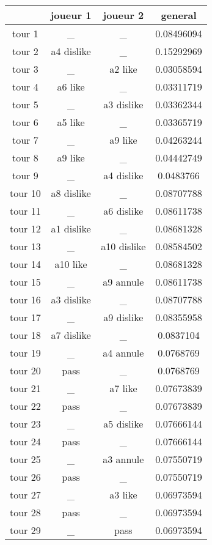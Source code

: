 \documentclass{article}
\begin{document}
\begin{tabular}{|c|c|c|c|}
\hline
& joueur 1 & joueur 2 & general \\
\hline
tour 1 & \_ & \_ & 0.08496094 \\
\hline
tour 2 & a4 dislike & \_ & 0.15292969 \\
\hline
tour 3 & \_ & a2 like & 0.03058594 \\
\hline
tour 4 & a6 like & \_ & 0.03311719 \\
\hline
tour 5 & \_ & a3 dislike & 0.03362344 \\
\hline
tour 6 & a5 like & \_ & 0.03365719 \\
\hline
tour 7 & \_ & a9 like & 0.04263244 \\
\hline
tour 8 & a9 like & \_ & 0.04442749 \\
\hline
tour 9 & \_ & a4 dislike & 0.0483766 \\
\hline
tour 10 & a8 dislike & \_ & 0.08707788 \\
\hline
tour 11 & \_ & a6 dislike & 0.08611738 \\
\hline
tour 12 & a1 dislike & \_ & 0.08681328 \\
\hline
tour 13 & \_ & a10 dislike & 0.08584502 \\
\hline
tour 14 & a10 like & \_ & 0.08681328 \\
\hline
tour 15 & \_ & a9 annule & 0.08611738 \\
\hline
tour 16 & a3 dislike & \_ & 0.08707788 \\
\hline
tour 17 & \_ & a9 dislike & 0.08355958 \\
\hline
tour 18 & a7 dislike & \_ & 0.0837104 \\
\hline
tour 19 & \_ & a4 annule & 0.0768769 \\
\hline
tour 20 & pass & \_ & 0.0768769 \\
\hline
tour 21 & \_ & a7 like & 0.07673839 \\
\hline
tour 22 & pass & \_ & 0.07673839 \\
\hline
tour 23 & \_ & a5 dislike & 0.07666144 \\
\hline
tour 24 & pass & \_ & 0.07666144 \\
\hline
tour 25 & \_ & a3 annule & 0.07550719 \\
\hline
tour 26 & pass & \_ & 0.07550719 \\
\hline
tour 27 & \_ & a3 like & 0.06973594 \\
\hline
tour 28 & pass & \_ & 0.06973594 \\
\hline
tour 29 & \_ & pass & 0.06973594 \\
\hline
\end{tabular}
\end{document}
